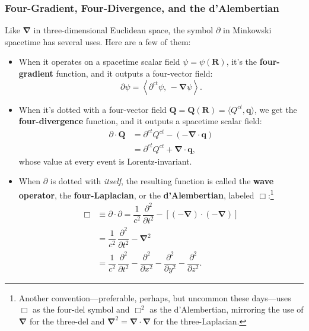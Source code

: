 \documentclass[12pt]{article}
\renewcommand{\vv}[1]{\mathbf{#1}}
\newcommand{\del}{\boldsymbol{\nabla}}
\begin{document}
\subsubsection{Four-Gradient, Four-Divergence, and the d'Alembertian}

Like $\del$ in three-dimensional Euclidean space, the symbol $\partialup$ in Minkowski spacetime has several uses. Here are a few of them:
\begin{itemize}
\item{
When it operates on a spacetime scalar field $\psi = \psi (\vv R)$, it's the \textbf{four-gradient} function, and it outputs a four-vector field:
\begin{equation*}
\partialup \psi = \left \langle \partial^{ct} \psi, \, -\del \psi \right \rangle.
\end{equation*}
}
\item{
When it's dotted with a four-vector field $\vv Q = \vv Q (\vv R) = \langle Q^{ct}, \vv q \rangle$, we get the \textbf{four-divergence} function, and it outputs a spacetime scalar field:
\begin{equation*}
\begin{split}
\partialup \cdot \vv Q &= \partial^{ct} Q^{ct} - \left( - \del \cdot \vv q \right) \\
&= \partial^{ct} Q^{ct} + \del \cdot \vv q ,
\end{split}
\end{equation*}
whose value at every event is Lorentz-invariant.
}
\item{
When $\partialup$ is dotted with \emph{itself}, the resulting function is called the \textbf{wave operator}, the \textbf{four-Laplacian}, or the \textbf{d'Alembertian}, labeled $\Box$:\footnote{Another convention---preferable, perhaps, but uncommon these days---uses $\Box$ as the four-del symbol and $\Box^2$ as the d'Alembertian, mirroring the use of $\del$ for the three-del and $\del^2 = \del \cdot \del$ for the three-Laplacian.}
\begin{equation*}
\begin{split}
\Box &\equiv \partialup \cdot \partialup = \dfrac{1}{c^2} \, \dfrac{\partial^2}{\partial t^2} - \left[ \left( - \del \right) \cdot \left( - \del \right) \right] \\
&= \dfrac{1}{c^2} \, \dfrac{\partial^2}{\partial t^2} - \del^2 \\[4pt]
&= \dfrac{1}{c^2} \, \dfrac{\partial^2}{\partial t^2} - \dfrac{\partial^2}{\partial x^2} - \dfrac{\partial^2}{\partial y^2} - \dfrac{\partial^2}{\partial z^2} .

\end{split}
\end{equation*}}
\end{itemize}
\end{document}
